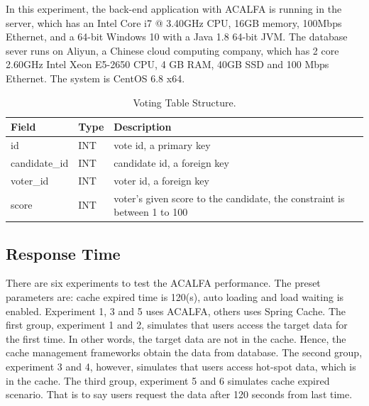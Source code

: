 \documentclass{singlecol-new}
\theoremstyle{TH}{
\newtheorem{lemma}{Lemma}
\newtheorem{theorem}[lemma]{Theorem}
\newtheorem{corrolary}[lemma]{Corrolary}
\newtheorem{conjecture}[lemma]{Conjecture}
\newtheorem{proposition}[lemma]{Proposition}
\newtheorem{claim}[lemma]{Claim}
\newtheorem{stheorem}[lemma]{Wrong Theorem}
}
\theoremstyle{THrm}{
\newtheorem{definition}{Definition}[section]
\newtheorem{question}{Question}[section]
\newtheorem{remark}{Remark}
\newtheorem{scheme}{Scheme}
}
\theoremstyle{THhit}{
\newtheorem{case}{Case}[section]
}
\begin{document}
In this experiment, the back-end application with ACALFA is running in the server, which has an Intel Core i7 @ 3.40GHz CPU, 16GB memory, 100Mbps Ethernet, and a 64-bit Windows 10 with a Java 1.8 64-bit JVM. The database sever runs on Aliyun, a Chinese cloud computing company, which has 2 core 2.60GHz Intel Xeon E5-2650 CPU, 4 GB RAM, 40GB SSD and 100 Mbps Ethernet. The system is CentOS 6.8 x64.

\begin{table}[htb]
\begin{center}
 \caption{\label{VTS}Voting Table Structure.}
 \begin{tabular}{lll}
 \toprule
    Field & Type & Description\\
 \midrule
    id & INT & vote id, a primary key\\
    candidate\_id & INT & candidate id, a foreign key\\
    voter\_id & INT & voter id, a foreign key\\
    score & INT & voter's given score to the candidate, the constraint is between 1 to 100\\
\bottomrule
 \end{tabular}
\end{center}
\end{table}

\subsection{Response Time}

There are six experiments to test the ACALFA performance. The preset parameters are: cache expired time is 120(s), auto loading and load waiting is enabled. Experiment 1, 3 and 5 uses ACALFA, others uses Spring Cache. The first group, experiment 1 and 2, simulates that users access the target data for the first time. In other words, the target data are not in the cache. Hence, the cache management frameworks obtain the data from database. The second group, experiment 3 and 4, however, simulates that users access hot-spot data, which is in the cache. The third group, experiment 5 and 6 simulates cache expired scenario. That is to say users request the data after 120 seconds from last time.
\end{document}
